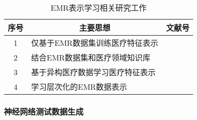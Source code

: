 \begin{table}
    \renewcommand\arraystretch{1.5}
    \begin{small}
        \caption{EMR表示学习相关研究工作}
        \label{tab:representation}
        \begin{center}
            \begin{tabular}[c]{cll}
                \toprule
                \multicolumn{1}{c}{\textbf{序号}} &
                \multicolumn{1}{c}{\textbf{主要思想}} &
                \multicolumn{1}{c}{\textbf{文献号}}\\
                \midrule
                1 & 仅基于EMR数据集训练医疗特征表示 & \cite{tran2015learning}
                \cite{miotto2016deep} \cite{choi2016medical}
                 \cite{cai2018medical} \cite{peng2019temporal}
                 \cite{bai2019medical}\\
                2 & 结合EMR数据集和医疗领域知识库 & \cite{choi2017gram}
                \cite{choi2018mime} \cite{ma2018kame} \cite{song2019medical}\\
                3 & 基于异构医疗数据学习医疗特征表示 & \cite{choi2016learning}
                \cite{bai2017joint} \cite{ma2018drug}\\
                4 & 学习层次化的EMR数据表示 & \cite{choi2016multi}
                \cite{choi2020learning}\\
                \bottomrule
            \end{tabular}
        \end{center}
    \end{small}
\end{table}

{}

\subsubsection{神经网络测试数据生成}

